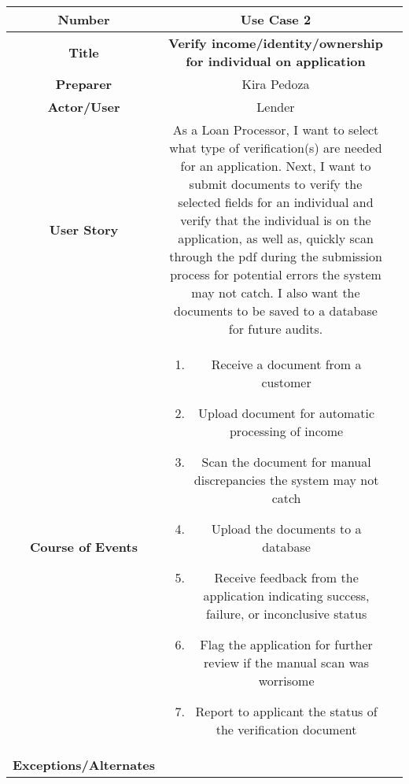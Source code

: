 \begin{table}[H]
    \centering
    \begin{tabularx}{0.75\linewidth}{||Sc|X||}
        \hline
        \hline
        \textbf{Number} & \textbf{Use Case 2} \\
        \hline
        \textbf{Title} & \textbf{Verify income/identity/ownership for individual on application} \\
        \hline
        \textbf{Preparer} & Kira Pedoza \\
        \hline
        \textbf{Actor/User} & Lender \\
        \hline
        \textbf{User Story} &
        As a Loan Processor, I want to select what type of verification(s) are needed for an application. Next, I want to submit documents to verify the selected fields for an individual and verify that the individual is on the application, as well as, quickly scan through the pdf during the submission process for potential errors the system may not catch. I also want the documents to be saved to a database for future audits.  \\
        \hline
        \textbf{Course of Events} &
        \begin{minipage}[l]{\linewidth}
            \begin{enumerate}[wide, labelindent=0pt]
                \item Receive a document from a customer
                \item Upload document for automatic processing of income
                \item Scan the document for manual discrepancies the system may not catch
                \item Upload the documents to a database
                \item Receive feedback from the application indicating success, failure, or inconclusive status
                \item Flag the application for further review if the manual scan was worrisome
                \item Report to applicant the status of the verification document
            \end{enumerate}
            \vspace{4pt}
        \end{minipage} \\
        \hline
        \textbf{Exceptions/Alternates} & 
        \begin{minipage}[l]{\linewidth}
            \vspace{2pt}

\end{minipage}
\end{tabularx}
\end{table}
